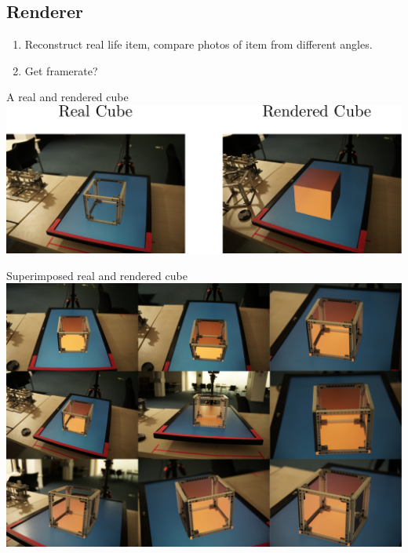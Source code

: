 \subsection{Renderer}
\begin{enumerate}
	\item Reconstruct real life item, compare photos of item from different angles. 
	\item Get framerate?
\end{enumerate}

\begin{figureBox}[label={fig:real-vs-rendered}, width=1.0\linewidth]{A real and rendered cube}
	\includegraphics[width = 1.0\linewidth]{./evaluation/figures/real-vs-rendered.pdf}
\end{figureBox}


\begin{figureBox}[label={fig:real-vs-rendered}, width=1.0\linewidth]{Superimposed real and rendered cube}
	\includegraphics[width = 1.0\linewidth]{./evaluation/figures/super-imposed.pdf}
\end{figureBox}
